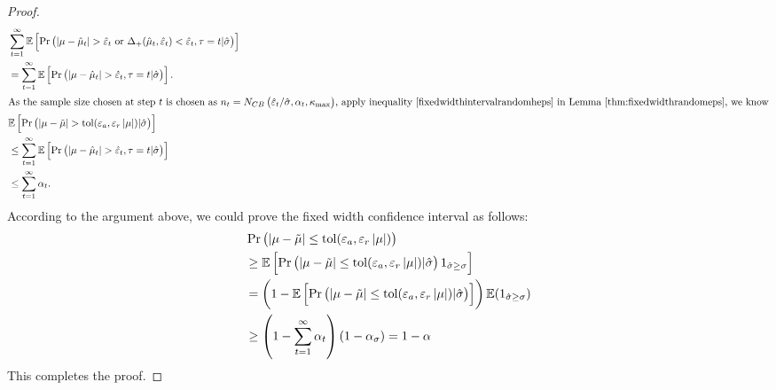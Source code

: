 \documentclass{iitthesis}
\begin{document}
\begin{proof}
\begin{align}
&\sum_{t=1}^\infty \mathbb{E}\left[\Pr \left( \left \lvert \mu-\hat{\mu}_t \right \rvert> \hat{\varepsilon}_t  \text{ or } \Delta_{+}(\hat{\mu}_t,\hat{\varepsilon}_t)<\hat{\varepsilon}_t , \tau = t |\hat{\sigma}\right)\right]\\
&= \sum_{t=1}^\infty\mathbb{E}\left[ \Pr \left( \left \lvert \mu-\hat{\mu}_t \right \rvert> \hat{\varepsilon}_t, \tau = t |\hat{\sigma} \right)\right].\\
\intertext{As the sample size chosen at step $t$ is chosen as $n_t  =N_{CB}\left(\hat{\varepsilon}_t/\hat{\sigma},\alpha_t,\kappa_{\max}\right)$, apply inequality \eqref{fixedwidthintervalrandomheps} in Lemma \ref{thm:fixedwidthrandomeps}, we know}
&\mathbb{E}\left[\Pr \left( \left \lvert \mu-\tilde{\mu} \right \rvert> \operatorname{tol}(\varepsilon_a,\varepsilon_r\left \lvert \mu \right \rvert) | \hat{\sigma} \right)\right]\\
 &\leq\sum_{t=1}^\infty \mathbb{E}\left[\Pr \left( \left \lvert \mu-\hat{\mu}_t \right \rvert> \hat{\varepsilon}_t, \tau = t |\hat{\sigma} \right)\right] \\ & \leq \sum_{t=1}^\infty \alpha_t. 
\end{align}
According to the argument above, we could prove the fixed width confidence interval as follows:
\begin{align}
&\Pr\left (\left \lvert \mu-\tilde{\mu} \right \rvert \leq \operatorname{tol}(\varepsilon_a, \varepsilon_r \left \lvert \mu \right \rvert)\right)\\
& \geq \mathbb{E}\left[\Pr\left (\left \lvert \mu-\tilde{\mu} \right \rvert \leq \operatorname{tol}(\varepsilon_a, \varepsilon_r \left \lvert \mu \right \rvert) |\hat{\sigma}\right)1_{\hat{\sigma} \geq \sigma}\right]\\
& = \left(1-\mathbb{E}\left[\Pr\left (\left \lvert \mu-\tilde{\mu} \right \rvert \leq \operatorname{tol}(\varepsilon_a, \varepsilon_r \left \lvert \mu \right \rvert) |\hat{\sigma}\right)\right]\right) \mathbb{E}(1_{\hat{\sigma} \geq \sigma})\\
& \geq \left(1-\sum_{t=1}^\infty \alpha_t\right)(1-\alpha_\sigma) = 1-\alpha
\end{align}
This completes the proof.

\end{proof}
\end{document}
